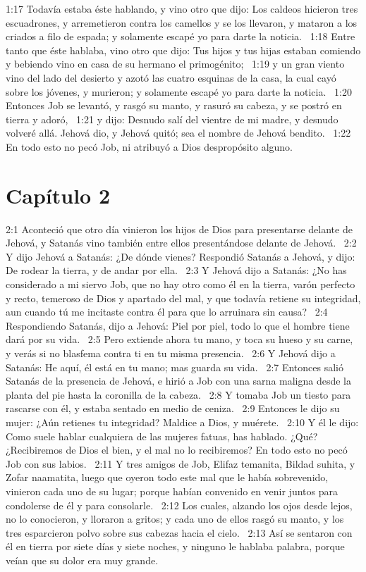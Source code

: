 1:17 Todavía estaba éste hablando, y vino otro que dijo: Los caldeos hicieron tres escuadrones, y arremetieron contra los camellos y se los llevaron, y mataron a los criados a filo de espada; y solamente escapé yo para darte la noticia.  
1:18 Entre tanto que éste hablaba, vino otro que dijo: Tus hijos y tus hijas estaban comiendo y bebiendo vino en casa de su hermano el primogénito;  
1:19 y un gran viento vino del lado del desierto y azotó las cuatro esquinas de la casa, la cual cayó sobre los jóvenes, y murieron; y solamente escapé yo para darte la noticia.  
1:20 Entonces Job se levantó, y rasgó su manto, y rasuró su cabeza, y se postró en tierra y adoró,  
1:21 y dijo: Desnudo salí del vientre de mi madre, y desnudo volveré allá. Jehová dio, y Jehová quitó; sea el nombre de Jehová bendito.  
1:22 En todo esto no pecó Job, ni atribuyó a Dios despropósito alguno.  
\section*{Capítulo 2 }

2:1 Aconteció que otro día vinieron los hijos de Dios para presentarse delante de Jehová, y Satanás vino también entre ellos presentándose delante de Jehová.  
2:2 Y dijo Jehová a Satanás: ¿De dónde vienes? Respondió Satanás a Jehová, y dijo: De rodear la tierra, y de andar por ella.  
2:3 Y Jehová dijo a Satanás: ¿No has considerado a mi siervo Job, que no hay otro como él en la tierra, varón perfecto y recto, temeroso de Dios y apartado del mal, y que todavía retiene su integridad, aun cuando tú me incitaste contra él para que lo arruinara sin causa?  
2:4 Respondiendo Satanás, dijo a Jehová: Piel por piel, todo lo que el hombre tiene dará por su vida.  
2:5 Pero extiende ahora tu mano, y toca su hueso y su carne, y verás si no blasfema contra ti en tu misma presencia.  
2:6 Y Jehová dijo a Satanás: He aquí, él está en tu mano; mas guarda su vida.  
2:7 Entonces salió Satanás de la presencia de Jehová, e hirió a Job con una sarna maligna desde la planta del pie hasta la coronilla de la cabeza.  
2:8 Y tomaba Job un tiesto para rascarse con él, y estaba sentado en medio de ceniza.  
2:9 Entonces le dijo su mujer: ¿Aún retienes tu integridad? Maldice a Dios, y muérete.  
2:10 Y él le dijo: Como suele hablar cualquiera de las mujeres fatuas, has hablado. ¿Qué? ¿Recibiremos de Dios el bien, y el mal no lo recibiremos? En todo esto no pecó Job con sus labios.  
2:11 Y tres amigos de Job, Elifaz temanita, Bildad suhita, y Zofar naamatita, luego que oyeron todo este mal que le había sobrevenido, vinieron cada uno de su lugar; porque habían convenido en venir juntos para condolerse de él y para consolarle.  
2:12 Los cuales, alzando los ojos desde lejos, no lo conocieron, y lloraron a gritos; y cada uno de ellos rasgó su manto, y los tres esparcieron polvo sobre sus cabezas hacia el cielo.  
2:13 Así se sentaron con él en tierra por siete días y siete noches, y ninguno le hablaba palabra, porque veían que su dolor era muy grande.  
